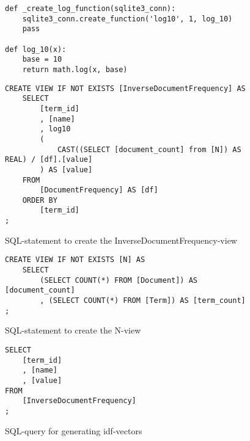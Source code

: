 \begin{figure}
    \lstset{language=Python}
    \begin{lstlisting}
def _create_log_function(sqlite3_conn):
    sqlite3_conn.create_function('log10', 1, log_10)
    pass

def log_10(x):
    base = 10
    return math.log(x, base)
    \end{lstlisting}
    \lstset{language=SQL}
    \begin{lstlisting}
CREATE VIEW IF NOT EXISTS [InverseDocumentFrequency] AS
    SELECT
        [term_id]
        , [name]
        , log10
        (
            CAST((SELECT [document_count] from [N]) AS REAL) / [df].[value]
        ) AS [value]
    FROM
        [DocumentFrequency] AS [df]
    ORDER BY
        [term_id]
;
    \end{lstlisting}
    \caption{SQL-statement to create the InverseDocumentFrequency-view}
    \label{fig:idf-view}
\end{figure}


\begin{figure}
    \lstset{language=SQL}
    \begin{lstlisting}
CREATE VIEW IF NOT EXISTS [N] AS
    SELECT
        (SELECT COUNT(*) FROM [Document]) AS [document_count]
        , (SELECT COUNT(*) FROM [Term]) AS [term_count]
;
    \end{lstlisting}
    \caption{SQL-statement to create the N-view}
    \label{fig:n-view}
\end{figure}


\begin{figure}
    \lstset{language=SQL}
    \begin{lstlisting}
SELECT
    [term_id]
    , [name]
    , [value]
FROM
    [InverseDocumentFrequency]
;
    \end{lstlisting}
    \caption{SQL-query for generating idf-vectors}
    \label{fig:idf-query}
\end{figure}


